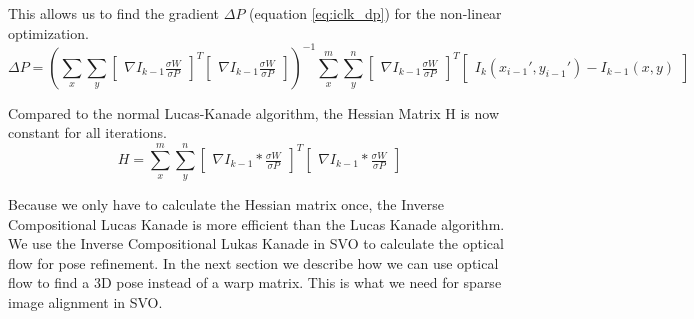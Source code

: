 \documentclass[11pt,a4paper,titlepage,oneside]{report}
\begin{document}
This allows us to find the gradient $\Delta P$ (equation \ref{eq:iclk_dp}) for the non-linear optimization.
\tiny
\begin{equation}\label{eq:iclk_dp}
  \Delta P=(\sum_x\sum_y\begin{bmatrix}\nabla I_{k-1}\frac{\sigma W}{\sigma P}\end{bmatrix}^T\begin{bmatrix}\nabla I_{k-1}\frac{\sigma W}{\sigma P}\end{bmatrix})^{-1}
  \sum_x^m\sum_y^n\begin{bmatrix}\nabla I_{k-1}\frac{\sigma W}{\sigma P}\end{bmatrix}^T\begin{bmatrix}I_{k}(x_{i-1}',y_{i-1}') - I_{k-1}(x,y)\end{bmatrix}
\end{equation}
\normalsize

Compared to the normal Lucas-Kanade algorithm, the Hessian Matrix H is now constant for all iterations.
\begin{equation}
  H=\sum_x^m\sum_y^n\begin{bmatrix}\nabla I_{k-1}*\frac{\sigma W}{\sigma P}\end{bmatrix}^T\begin{bmatrix}\nabla I_{k-1}*\frac{\sigma W}{\sigma P}\end{bmatrix}
\end{equation}

Because we only have to calculate the Hessian matrix once, the Inverse Compositional Lucas Kanade is more efficient than the Lucas Kanade algorithm.\\
We use the Inverse Compositional Lukas Kanade in SVO to calculate the optical flow for pose refinement. In the next section we describe how we can use optical flow to find a 3D pose instead of a warp matrix. This is what we need for sparse image alignment in SVO.
\end{document}
